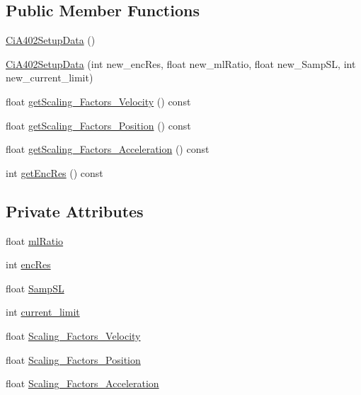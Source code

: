 \subsection*{Public Member Functions}
\begin{DoxyCompactItemize}
\item 
\hyperlink{classCiA402SetupData_a75fda7c40eed83f736c227cf681bd0c5}{Ci\+A402\+Setup\+Data} ()
\item 
\hyperlink{classCiA402SetupData_ae7f96988b42fad6572e8227c5a6d1093}{Ci\+A402\+Setup\+Data} (int new\+\_\+enc\+Res, float new\+\_\+ml\+Ratio, float new\+\_\+\+Samp\+SL, int new\+\_\+current\+\_\+limit)
\item 
float \hyperlink{classCiA402SetupData_a97fa96f9f1fdc0b1367ef6b16e8974cf}{get\+Scaling\+\_\+\+Factors\+\_\+\+Velocity} () const 
\item 
float \hyperlink{classCiA402SetupData_afb42382bb460634c986f3e07a7fff583}{get\+Scaling\+\_\+\+Factors\+\_\+\+Position} () const 
\item 
float \hyperlink{classCiA402SetupData_aa1f8fb8d5a63b0a4dfa64051e98fa5e6}{get\+Scaling\+\_\+\+Factors\+\_\+\+Acceleration} () const 
\item 
int \hyperlink{classCiA402SetupData_a45e664d22fb598a8c267952ddbd7d1c3}{get\+Enc\+Res} () const 
\end{DoxyCompactItemize}
\subsection*{Private Attributes}
\begin{DoxyCompactItemize}
\item 
float \hyperlink{classCiA402SetupData_a35fc6c4d83a6b9cbb784532d75cf03b3}{ml\+Ratio}
\item 
int \hyperlink{classCiA402SetupData_a8d83cf7dce1f2aeaec2200c7567952b4}{enc\+Res}
\item 
float \hyperlink{classCiA402SetupData_a7dc6400c193ecfe21977437e7c5ac85f}{Samp\+SL}
\item 
int \hyperlink{classCiA402SetupData_a66da9919252d096f1190a70465dce20f}{current\+\_\+limit}
\item 
float \hyperlink{classCiA402SetupData_a1ac5a8bab56e6282f87684d4c7249225}{Scaling\+\_\+\+Factors\+\_\+\+Velocity}
\item 
float \hyperlink{classCiA402SetupData_a81ef1e6479ad92e748e33921dbf3cd25}{Scaling\+\_\+\+Factors\+\_\+\+Position}
\item 
float \hyperlink{classCiA402SetupData_afa253899425284c2fa62fdb678dc4907}{Scaling\+\_\+\+Factors\+\_\+\+Acceleration}
\end{DoxyCompactItemize}


